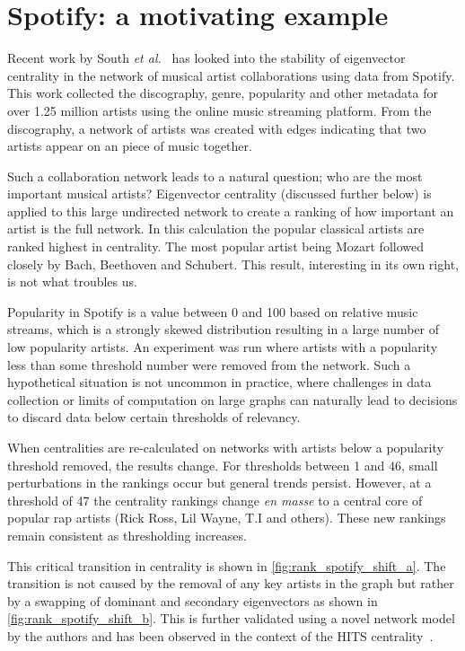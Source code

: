 \section{Spotify: a motivating example}

Recent work by South \emph{et al.}~\cite{south_centrality_2021} has looked into the stability of eigenvector centrality in the network of musical artist collaborations using data from Spotify. This work collected the discography, genre, popularity and other metadata for over 1.25 million artists using the online music streaming platform. From the discography, a network of artists was created with edges indicating that two artists appear on an piece of music together. 

Such a collaboration network leads to a natural question; who are the most important musical artists? Eigenvector centrality (discussed further below) is applied to this large undirected network to create a ranking of how important an artist is the full network. In this calculation the popular classical artists are ranked highest in centrality. The most popular artist being Mozart followed closely by Bach, Beethoven and Schubert. This result, interesting in its own right, is not what troubles us.

Popularity in Spotify is a value between 0 and 100 based on relative music streams, which is a strongly skewed distribution resulting in a large number of low popularity artists. An experiment was run where artists with a popularity less than some threshold number were removed from the network.  Such a hypothetical situation is not uncommon in practice, where challenges in data collection or limits of computation on large graphs can naturally lead to decisions to discard data below certain thresholds of relevancy.

When centralities are re-calculated on networks with artists below a popularity threshold removed, the results change. For thresholds between 1 and 46, small perturbations in the rankings occur but general trends persist. However, at a threshold of 47 the centrality rankings change {\em en masse} to a central core of popular rap artists (Rick Ross, Lil Wayne, T.I and others). These new rankings remain consistent as thresholding increases.

This critical transition in centrality is shown in \autoref{fig:rank_spotify_shift_a}. The transition is not caused by the removal of any key artists in the graph but rather by a swapping of dominant and secondary eigenvectors as shown in \autoref{fig:rank_spotify_shift_b}. This is further validated using a novel network model by the authors and has been observed in the context of the HITS centrality~\cite{ng_link_2001}.


